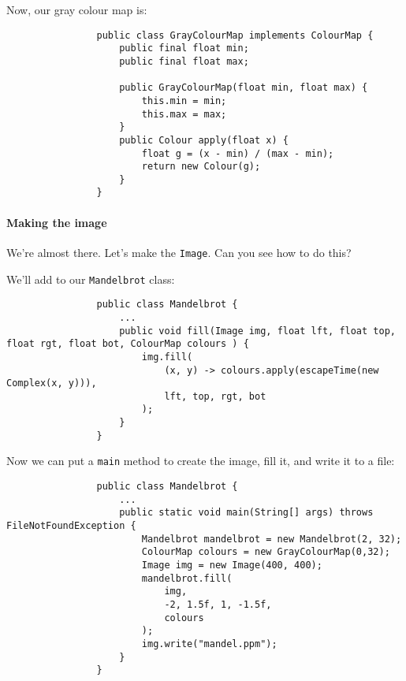 \documentclass{article}
\begin{document}
            Now, our gray colour map is:
            
            \begin{verbatim}
                public class GrayColourMap implements ColourMap {
                    public final float min;
                    public final float max;
                    
                    public GrayColourMap(float min, float max) {
                        this.min = min;
                        this.max = max;
                    }
                    public Colour apply(float x) {
                        float g = (x - min) / (max - min);
                        return new Colour(g);
                    }
                }
            \end{verbatim}
            
        \paragraph{Making the image}
            We're almost there.  Let's make the \texttt{Image}. Can you see how to do this?
            
            We'll add to our \texttt{Mandelbrot} class:
            
            \begin{verbatim}
                public class Mandelbrot {
                    ...
                    public void fill(Image img, float lft, float top, float rgt, float bot, ColourMap colours ) {
                        img.fill(
                            (x, y) -> colours.apply(escapeTime(new Complex(x, y))),
                            lft, top, rgt, bot
                        );
                    }
                }
            \end{verbatim}
            
            Now we can put a \texttt{main} method to create the image, fill it, and write it to a file:
            \begin{verbatim}
                public class Mandelbrot {
                    ...
                    public static void main(String[] args) throws FileNotFoundException {
                        Mandelbrot mandelbrot = new Mandelbrot(2, 32);
                        ColourMap colours = new GrayColourMap(0,32);
                        Image img = new Image(400, 400);
                        mandelbrot.fill(
                            img, 
                            -2, 1.5f, 1, -1.5f, 
                            colours
                        );
                        img.write("mandel.ppm");
                    }
                }
            \end{verbatim}
            
\end{document}
